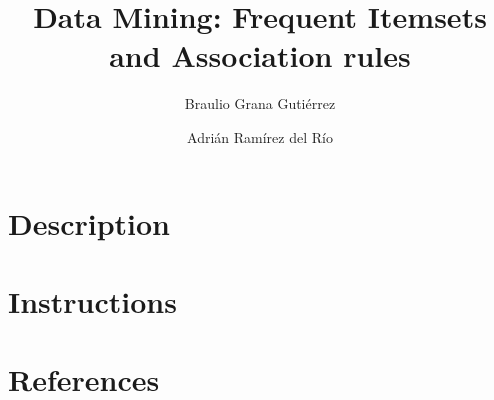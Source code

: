 \documentclass[12pt, a4paper]{article}
\title{Data Mining: Frequent Itemsets and Association rules}
\author{Braulio Grana Guti\'errez \and Adri\'an Ram\'irez del R\'io}
\begin{document}
\maketitle

\section*{Description}


\section*{Instructions}


\section*{References}
\end{document}
